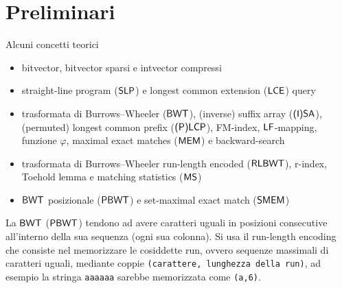 \documentclass[]{beamer}
\def\SLP{\mbox{\rm {\sf SLP}}}
\def\LCE{\mbox{\rm {\sf LCE}}}
\def\LF{\mbox{\rm {\sf LF}}}
\def\IISA{\mbox{\rm {\sf (I)SA}}}
\def\PPLCP{\mbox{\rm {\sf (P)LCP}}}
\def\RLBWT{\mbox{\rm {\sf RLBWT}}}
\def\MEM{\mbox{\rm {\sf MEM}}}
\def\MS{\mbox{\rm {\sf MS}}}
\def\BWT{\mbox{\rm {\sf BWT}}}
\def\PBWT{\mbox{\rm {\sf PBWT}}}
\def\SMEM{\mbox{\rm {\sf SMEM}}}
\def\LCE{\mbox{\rm {\sf LCE}}}
\begin{document}
\section{Preliminari}
\begin{frame}{Alcuni concetti teorici}
  \begin{block}{}
    \small{
    \begin{itemize}
      \item bitvector, bitvector sparsi e intvector compressi
      \item straight-line program ($\SLP$) e longest common extension ($\LCE$)
      query 
      \item trasformata di Burrows--Wheeler ($\BWT$), (inverse) suffix array
      ($\IISA$), (permuted) longest common prefix ($\PPLCP$), FM-index,
      $\LF$-mapping, funzione $\varphi$, maximal exact matches ($\MEM$) e
      backward-search 
      \item trasformata di Burrows--Wheeler run-length encoded ($\RLBWT$),
      r-index, Toehold lemma e matching statistics ($\MS$)
      \item $\BWT$ posizionale ($\PBWT$) e set-maximal
      exact match ($\SMEM$)
    \end{itemize}}
  \end{block}
  \begin{block}{}
    \small{
    La $\BWT$ ($\PBWT$) tendono ad avere caratteri uguali in posizioni
    consecutive all'interno della sua sequenza (ogni sua colonna). Si usa il
    run-length encoding che consiste nel memorizzare le cosiddette run, ovvero
    sequenze massimali di caratteri uguali, mediante coppie \texttt{(carattere,
    lunghezza della run)}, ad esempio la stringa \texttt{aaaaaa} sarebbe memorizzata come
    \texttt{(a,6)}. }
  \end{block}
\end{frame}
\end{document}
